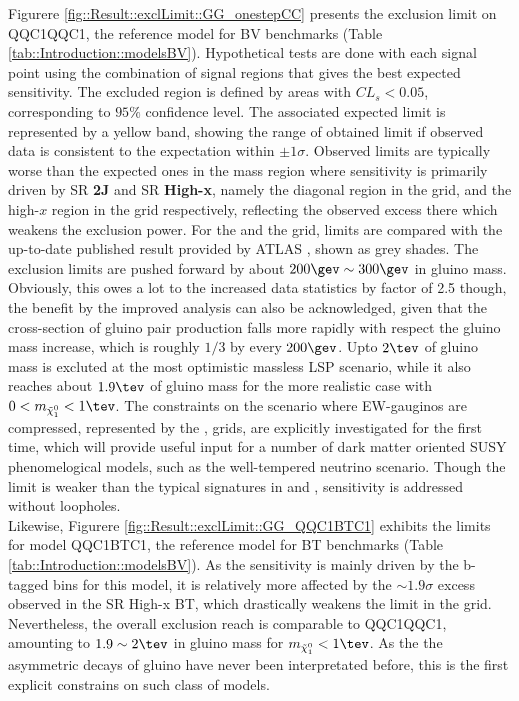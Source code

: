 Figurere \ref{fig::Result::exclLimit::GG_onestepCC} presents the exclusion limit on QQC1QQC1, the reference model for BV benchmarks (Table \ref{tab::Introduction::modelsBV}). Hypothetical tests are done with each signal point using the combination of signal regions that gives the best expected sensitivity. The excluded region is defined by areas with $CL_s<0.05$, corresponding to $95\%$ confidence level. The associated expected limit is represented by a yellow band, showing the range of obtained limit if observed data is consistent to the expectation within $\pm1\sigma$. Observed limits are typically worse than the expected ones in the mass region where sensitivity is primarily driven by SR \textbf{2J} and SR \textbf{High-x}, namely the diagonal region in the \xhalf grid, and the high-$x$ region in the \varx grid respectively, reflecting the observed excess there which weakens the exclusion power. For the \xhalf and the \varx grid, limits are compared with the up-to-date published result provided by ATLAS \cite{strong1L_ICHEP2016_CONF}, shown as grey shades. The exclusion limits are pushed forward by about $200\gev\sim300\gev$ in gluino mass. Obviously, this owes a lot to the increased data statistics by factor of 2.5 though, the benefit by the improved analysis can also be acknowledged, given that the cross-section of gluino pair production falls more rapidly with respect the gluino mass increase, which is roughly $1/3$ by every $200\gev$. Upto $2\tev$ of gluino mass is excluted at the most optimistic massless LSP scenario, while it also reaches about $1.9\tev$ of gluino mass for the more realistic case with $0<\mLSP<1\tev$. 
% 
The constraints on the scenario where EW-gauginos are compressed, 
represented by the \DMth, \DMtw grids,
are explicitly investigated for the first time, which will provide useful input for a number of dark matter oriented SUSY phenomelogical models, such as the well-tempered neutrino scenario.
Though the limit is weaker than the typical signatures in \xhalf and \varx, sensitivity is addressed without loopholes. \\

Likewise, Figurere \ref{fig::Result::exclLimit::GG_QQC1BTC1} exhibits the limits for model QQC1BTC1, the reference model for BT benchmarks (Table \ref{tab::Introduction::modelsBV}). As the sensitivity is mainly driven by the b-tagged bins for this model, it is relatively more affected by the $\sim 1.9\sigma$ excess observed in the SR High-x BT, which drastically weakens the limit in the \varx grid. Nevertheless, the overall exclusion reach is comparable to QQC1QQC1, amounting to $1.9\sim2\tev$ in gluino mass for $\mLSP <1\tev$. As the the asymmetric decays of gluino have never been interpretated before, this is the first explicit constrains on such class of models. \\


